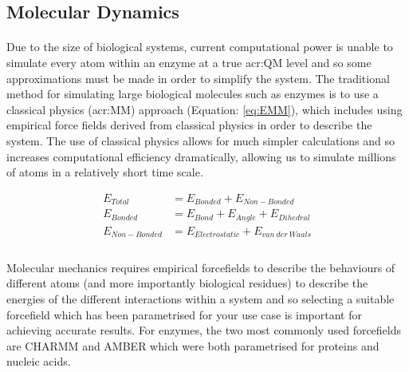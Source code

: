 \subsection{Molecular Dynamics}
\paragraph{}
Due to the size of biological systems, current computational power is unable to simulate every atom within an enzyme at a true \gls{acr:QM} level and so some approximations must be made in order to simplify the system. The traditional method for simulating large biological molecules such as enzymes is to use a classical physics (\gls{acr:MM}) approach (Equation: \ref{eq:EMM}), which includes using empirical force fields derived from classical physics in order to describe the system. The use of classical physics allows for much simpler calculations and so increases computational efficiency dramatically, allowing us to simulate millions of atoms in a relatively short time scale. 

\begin{equation}
\label{eq:EMM}
\begin{split}
E_{Total} & = E_{Bonded} + E_{Non-Bonded} \\
E_{Bonded} & = E_{Bond} + E_{Angle} + E_{Dihedral} \\
E_{Non-Bonded} & = E_{Electrostatic} + E_{van ~der ~Waals} \\
\end{split}
\end{equation}

\paragraph{}
Molecular mechanics requires empirical forcefields\cite{Ponder2003ForceSimulations} to describe the behaviours of different atoms (and more importantly biological residues) to describe the energies of the different interactions within a system and so selecting a suitable forcefield which has been parametrised for your use case is important for achieving accurate results. For enzymes, the two most commonly used forcefields are CHARMM\cite{Vanommeslaeghe2009CHARMMFields} and AMBER\cite{Maier2015Ff14SB:Ff99SB} which were both parametrised for proteins and nucleic acids. 

